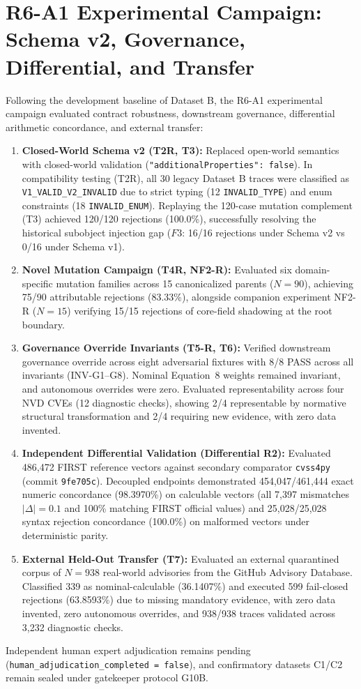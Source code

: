 \section{R6-A1 Experimental Campaign: Schema v2, Governance, Differential, and Transfer}
\label{sec:r6_a1_campaign}
Following the development baseline of Dataset B, the R6-A1 experimental campaign evaluated contract robustness, downstream governance, differential arithmetic concordance, and external transfer:
\begin{enumerate}
    \item \textbf{Closed-World Schema v2 (T2R, T3):} Replaced open-world semantics with closed-world validation (\texttt{"additionalProperties": false}). In compatibility testing (T2R), all 30 legacy Dataset B traces were classified as \texttt{V1\_VALID\_V2\_INVALID} due to strict typing (12 \texttt{INVALID\_TYPE}) and enum constraints (18 \texttt{INVALID\_ENUM}). Replaying the 120-case mutation complement (T3) achieved 120/120 rejections (100.0\%), successfully resolving the historical subobject injection gap ($F3$: 16/16 rejections under Schema v2 vs 0/16 under Schema v1).
    \item \textbf{Novel Mutation Campaign (T4R, NF2-R):} Evaluated six domain-specific mutation families across 15 canonicalized parents ($N=90$), achieving 75/90 attributable rejections (83.33\%), alongside companion experiment NF2-R ($N=15$) verifying 15/15 rejections of core-field shadowing at the root boundary.
    \item \textbf{Governance Override Invariants (T5-R, T6):} Verified downstream governance override across eight adversarial fixtures with 8/8 PASS across all invariants (INV-G1--G8). Nominal Equation~8 weights remained invariant, and autonomous overrides were zero. Evaluated representability across four NVD CVEs (12 diagnostic checks), showing 2/4 representable by normative structural transformation and 2/4 requiring new evidence, with zero data invented.
    \item \textbf{Independent Differential Validation (Differential R2):} Evaluated 486,472 FIRST reference vectors against secondary comparator \texttt{cvss4py} (commit \texttt{9fe705c}). Decoupled endpoints demonstrated 454,047/461,444 exact numeric concordance (98.3970\%) on calculable vectors (all 7,397 mismatches $|\Delta|=0.1$ and 100\% matching FIRST official values) and 25,028/25,028 syntax rejection concordance (100.0\%) on malformed vectors under deterministic parity.
    \item \textbf{External Held-Out Transfer (T7):} Evaluated an external quarantined corpus of $N=938$ real-world advisories from the GitHub Advisory Database. Classified 339 as nominal-calculable (36.1407\%) and executed 599 fail-closed rejections (63.8593\%) due to missing mandatory evidence, with zero data invented, zero autonomous overrides, and 938/938 traces validated across 3,232 diagnostic checks.
\end{enumerate}
Independent human expert adjudication remains pending (\texttt{human\_adjudication\_completed = false}), and confirmatory datasets C1/C2 remain sealed under gatekeeper protocol G10B.

